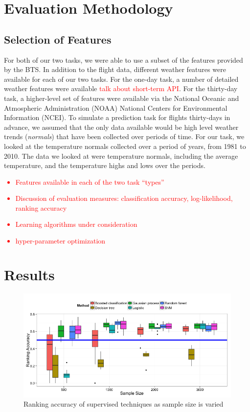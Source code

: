 \documentclass{article}
\begin{document}
\section{Evaluation Methodology}
\label{sec:evaluation-methodology}
\subsection{Selection of Features}

For both of our two tasks, we were able to use a subset of the features provided by the BTS. In addition to the flight data, different weather features were available for each of our two tasks. For the one-day task, a number of detailed weather features were available \textcolor{red}{talk about short-term API}. For the thirty-day task, a higher-level set of features were available via the National Oceanic and Atmospheric Administration (NOAA) National Centers for Environmental Information (NCEI). To simulate a prediction task for flights thirty-days in advance, we assumed that the only data available would be high level weather trends (\emph{normals}) that have been collected over periods of time. For our task, we looked at the temperature normals collected over a period of years, from 1981 to 2010. The data we looked at were temperature normals, including the average temperature, and the temperature highs and lows over the periods. 
\textcolor{red}{
    \begin{itemize}
        \item Features available in each of the two task ``types''
        \item Discussion of evaluation measures: classification accuracy, log-likelihood, ranking accuracy
        \item Learning algorithms under consideration
        \item hyper-parameter optimization
    \end{itemize}
}

\section{Results}
\label{sec:results}

\begin{figure}
    \centering
    \includegraphics[width=\textwidth]{figures/performance-by-sample-size.png}
    \caption{Ranking accuracy of supervised techniques as sample size is varied}
\end{figure}




\end{document}
